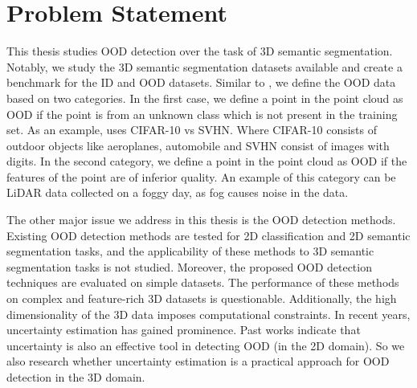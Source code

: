 \section{Problem Statement}
This thesis studies OOD detection over the task of 3D semantic segmentation.
Notably, we study the 3D semantic segmentation datasets available and create a benchmark for the ID and OOD datasets.
Similar to \cite{Cao}, we define the OOD data based on two categories.
In the first case, we define a point in the point cloud as OOD if the point is from an unknown class which is not present in the training set.
As an example, \cite{liang2017enhancing_ODIN} uses CIFAR-10 vs SVHN.
Where CIFAR-10 consists of outdoor objects like aeroplanes, automobile and SVHN consist of images with digits.
In the second category, we define a point in the point cloud as OOD if the features of the point are of inferior quality.
An example of this category can be LiDAR data collected on a foggy day, as fog causes noise in the data.


The other major issue we address in this thesis is the OOD detection methods. 
Existing OOD detection methods are tested for 2D classification and 2D semantic segmentation tasks, and the applicability of
these methods to 3D semantic segmentation tasks is not studied. Moreover, the proposed OOD detection
techniques are evaluated on simple datasets. The performance of these methods on complex and
feature-rich 3D datasets is questionable. Additionally, the high dimensionality of the 3D data imposes computational constraints. In recent years, uncertainty estimation has gained prominence. Past works
indicate that uncertainty is also an effective tool in detecting OOD (in the 2D domain). So we also research
whether uncertainty estimation is a practical approach for OOD detection in the 3D domain.
% 

